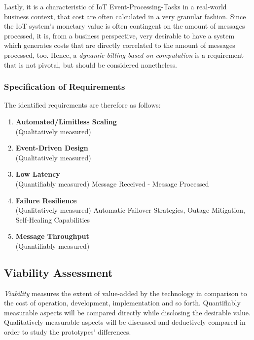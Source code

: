 Lastly, it is a characteristic of IoT Event-Processing-Tasks in a real-world business context, that cost are often calculated in a very granular fashion. Since the IoT system's monetary value is often contingent on the amount of messages processed, it is, from a business perspective, very desirable to have a system which generates costs that are directly correlated to the amount of messages processed, too. Hence, a \textit{dynamic billing based on computation} is a requirement that is not pivotal, but should be considered nonetheless.

\subsubsection{Specification of Requirements}

The identified requirements are therefore as follows:

\begin{enumerate}
    \item \textbf{Automated/Limitless Scaling}\\
        (Qualitatively measured)
    \item \textbf{Event-Driven Design}\\
        (Qualitatively measured) 
    \item \textbf{Low Latency}\\
        (Quantifiably measured) Message Received - Message Processed
    \item \textbf{Failure Resilience}\\
        (Qualitatively measured) Automatic Failover Strategies, Outage Mitigation, Self-Healing Capabilities
    \item \textbf{Message Throughput}\\
        (Quantifiably measured) 
\end{enumerate}



\subsection{Viability Assessment}

\textit{Viability} measures the extent of value-added by the technology in comparison to the cost of operation, development, implementation and so forth. Quantifiably measurable aspects will be compared directly while disclosing the desirable value. Qualitatively measurable aspects will be discussed and deductively compared in order to study the prototypes' differences. 

